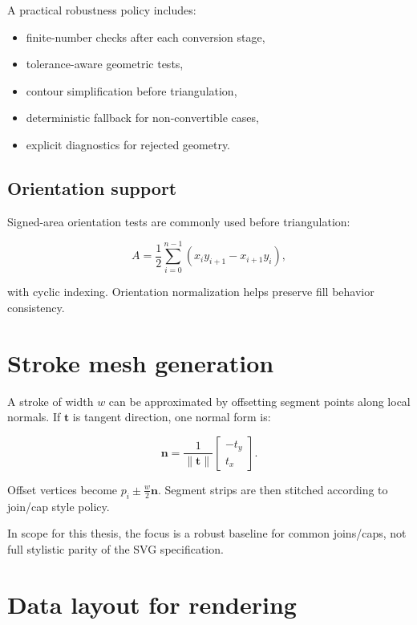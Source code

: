 A practical robustness policy includes:

\begin{itemize}
\item finite-number checks after each conversion stage,
\item tolerance-aware geometric tests,
\item contour simplification before triangulation,
\item deterministic fallback for non-convertible cases,
\item explicit diagnostics for rejected geometry.
\end{itemize}

\subsection{Orientation support}

Signed-area orientation tests are commonly used before triangulation:

\begin{equation}
A = \frac{1}{2}\sum_{i=0}^{n-1} \left(x_i y_{i+1} - x_{i+1} y_i\right),
\label{eq:signed_area_compact}
\end{equation}

with cyclic indexing.
Orientation normalization helps preserve fill behavior consistency.

\section{Stroke mesh generation}

A stroke of width $w$ can be approximated by offsetting segment points along local normals.
If $\mathbf{t}$ is tangent direction, one normal form is:

\begin{equation}
\mathbf{n} = \frac{1}{\|\mathbf{t}\|}
\begin{bmatrix}
-t_y \\
 t_x
\end{bmatrix}.
\label{eq:stroke_normal}
\end{equation}

Offset vertices become $p_i \pm \frac{w}{2}\mathbf{n}$.
Segment strips are then stitched according to join/cap style policy.

In scope for this thesis, the focus is a robust baseline for common joins/caps, not full stylistic parity of the SVG specification.

\section{Data layout for rendering}

